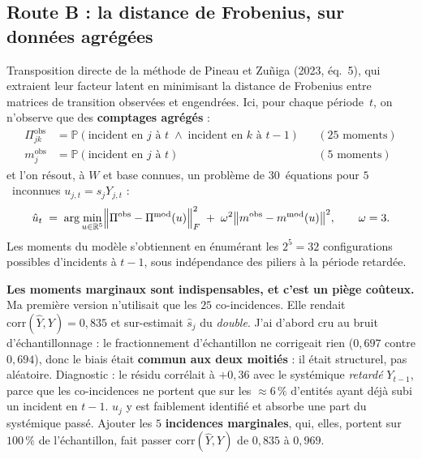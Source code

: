 \documentclass[11pt,a4paper]{article}
\newcommand{\Y}{Y}
\begin{document}
\subsection{Route B : la distance de Frobenius, sur données agrégées}

Transposition directe de la méthode de Pineau et Zuñiga (2023, éq.~5), qui extraient leur
facteur latent en minimisant la distance de Frobenius entre matrices de transition observées et
engendrées. Ici, pour chaque période~$t$, on n'observe que des \textbf{comptages agrégés} :
\begin{align}
\Pi^{\text{obs}}_{jk} &= \mathbb{P}(\text{incident en } j \text{ à } t
   \;\wedge\; \text{incident en } k \text{ à } t-1) && (25 \text{ moments}) \\
m^{\text{obs}}_{j}   &= \mathbb{P}(\text{incident en } j \text{ à } t)
   && (5 \text{ moments})
\end{align}
et l'on résout, à $W$ et base connues, un problème de $30$~équations pour $5$~inconnues
$u_{j,t} = s_j \Y_{j,t}$ :
\begin{equation}
\hat{u}_t \;=\; \arg\min_{u \in \mathbb{R}^5}
  \Bigl\lVert \Pi^{\text{obs}} - \Pi^{\text{mod}}(u) \Bigr\rVert_F^2
  \;+\; \omega^2 \bigl\lVert m^{\text{obs}} - m^{\text{mod}}(u) \bigr\rVert^2 ,
  \qquad \omega = 3 .
\end{equation}
Les moments du modèle s'obtiennent en énumérant les $2^5 = 32$ configurations possibles
d'incidents à $t-1$, sous indépendance des piliers à la période retardée.

\begin{attention}
\textbf{Les moments marginaux sont indispensables, et c'est un piège coûteux.} Ma première
version n'utilisait que les $25$ co-incidences. Elle rendait $\mathrm{corr}(\hat{\Y}, \Y) =
0{,}835$ et sur-estimait $\hat{s}_j$ du \emph{double}. J'ai d'abord cru au bruit
d'échantillonnage : le fractionnement d'échantillon ne corrigeait rien ($0{,}697$ contre
$0{,}694$), donc le biais était \textbf{commun aux deux moitiés} : il était structurel, pas
aléatoire. Diagnostic : le résidu corrélait à $+0{,}36$ avec le systémique \emph{retardé}
$\Y_{t-1}$, parce que les co-incidences ne portent que sur les $\approx 6\,\%$ d'entités ayant
déjà subi un incident en $t-1$. $u_j$ y est faiblement identifié et absorbe une part du
systémique passé. Ajouter les $5$ \textbf{incidences marginales}, qui, elles, portent sur
$100\,\%$ de l'échantillon, fait passer $\mathrm{corr}(\hat{\Y}, \Y)$ de $0{,}835$ à
$0{,}969$.
\end{attention}
\end{document}
